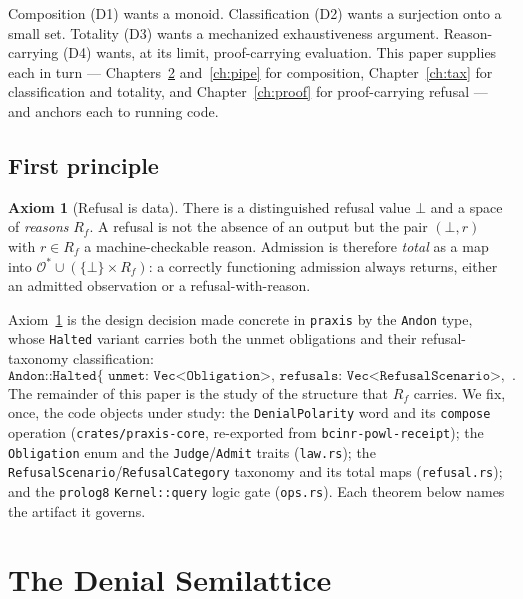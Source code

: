 \documentclass[11pt,oneside]{book}
\theoremstyle{definition}
\newtheorem{axiom}{Axiom}[chapter]
\theoremstyle{plain}
\theoremstyle{remark}
\newcommand{\Adm}{\mathcal{O}^{*}}             %
\newcommand{\Rfsl}{\bot}                        %
\newcommand{\code}[1]{\texttt{#1}}
\begin{document}
Composition (D1) wants a monoid. %
Classification (D2) wants a surjection onto a small set. %
Totality (D3) wants a mechanized exhaustiveness argument. %
Reason-carrying (D4) wants, at its limit, proof-carrying evaluation. %
This paper supplies each in turn --- Chapters~\ref{ch:sl} and~\ref{ch:pipe} for composition, Chapter~\ref{ch:tax} for classification and totality, and Chapter~\ref{ch:proof} for proof-carrying refusal --- and anchors each to running code. %

\section{First principle}

\begin{axiom}[Refusal is data]\label{ax:refusal}
There is a distinguished refusal value $\Rfsl$ and a space of \emph{reasons} $R_f$. %
A refusal is not the absence of an output but the pair $(\Rfsl,r)$ with $r\in R_f$ a machine-checkable reason. %
Admission is therefore \emph{total} as a map into $\Adm\cup(\{\Rfsl\}\times R_f)$: a correctly functioning admission always returns, either an admitted observation or a refusal-with-reason. %
\end{axiom}

Axiom~\ref{ax:refusal} is the design decision made concrete in \code{praxis} by the \code{Andon} type, whose \code{Halted} variant carries both the unmet obligations and their refusal-taxonomy classification: %
\[
\code{Andon::Halted\{\ unmet:\ Vec<Obligation>,\ refusals:\ Vec<RefusalScenario>,\ at:\ u64\ \}}.
\]
The remainder of this paper is the study of the structure that $R_f$ carries. %
We fix, once, the code objects under study: the \code{DenialPolarity} word and its \code{compose} operation (\code{crates/praxis-core}, re-exported from \code{bcinr-powl-receipt}); the \code{Obligation} enum and the \code{Judge}/\code{Admit} traits (\code{law.rs}); the \code{RefusalScenario}/\code{RefusalCategory} taxonomy and its total maps (\code{refusal.rs}); and the \code{prolog8} \code{Kernel::query} logic gate (\code{ops.rs}). %
Each theorem below names the artifact it governs. %

\chapter{The Denial Semilattice}
\label{ch:sl}
\end{document}
